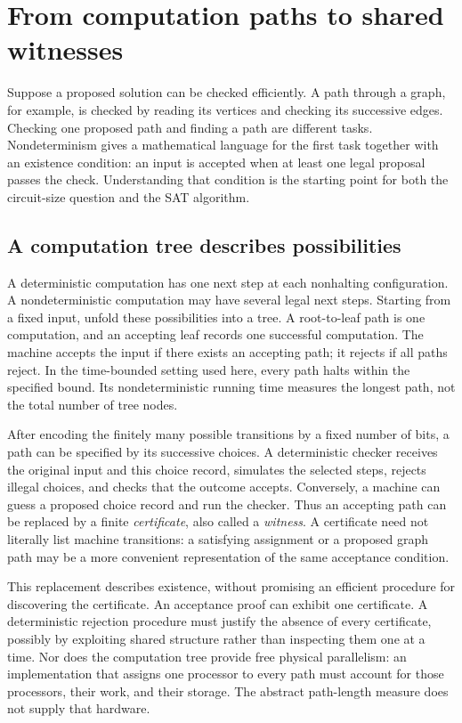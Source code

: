 \section{From computation paths to shared witnesses}\label{sec:foundations}

Suppose a proposed solution can be checked efficiently. A path through a
graph, for example, is checked by reading its vertices and checking its
successive edges. Checking one proposed path and finding a path are different
tasks. Nondeterminism gives a mathematical language for the first task
together with an existence condition: an input is accepted when at least
one legal proposal passes the check. Understanding that condition is the
starting point for both the circuit-size question and the SAT algorithm.

\subsection{A computation tree describes possibilities}

A deterministic computation has one next step at each nonhalting
configuration. A nondeterministic computation may have several legal next
steps. Starting from a fixed input, unfold these possibilities into a tree.
A root-to-leaf path is one computation, and an accepting leaf records one
successful computation. The machine accepts the input if there exists an
accepting path; it rejects if all paths reject. In the time-bounded setting
used here, every path halts within the specified bound. Its nondeterministic
running time measures the longest path, not the total number of tree nodes.

After encoding the finitely many possible transitions by a fixed number
of bits, a path can be specified by its successive choices. A deterministic
checker receives the original input and this choice record, simulates the
selected steps, rejects illegal choices, and checks that the outcome accepts.
Conversely, a machine can guess a proposed choice record and run the checker.
Thus an accepting path can be replaced by a finite \emph{certificate}, also
called a \emph{witness}. A certificate need not literally list machine
transitions: a satisfying assignment or a proposed graph path may be a
more convenient representation of the same acceptance condition.

This replacement describes existence, without promising an efficient
procedure for discovering the certificate. An acceptance proof can exhibit
one certificate. A deterministic rejection procedure must justify the
absence of every certificate, possibly by exploiting shared structure rather
than inspecting them one at a time. Nor does the computation tree provide
free physical parallelism: an implementation that assigns one processor to
every path must account for those processors, their work, and their storage.
The abstract path-length measure does not supply that hardware.

